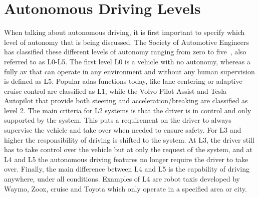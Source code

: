 
\section{Autonomous Driving Levels}
\label{sec:intro_ad}
When talking about autonomous driving, it is first important to specify which level of autonomy that is being discussed. The Society of Automotive Engineers has classified these different levels of autonomy ranging from zero to five~\cite{SAE2021}, also referred to as L0-L5. The first level L0 is a vehicle with no autonomy, whereas a fully \gls{av} that can operate in any environment and without any human supervision is defined as L5. Popular \gls{adas} functions today, like lane centering or adaptive cruise control are classified as L1, while the Volvo Pilot Assist and Tesla Autopilot that provide both steering and acceleration/breaking are classified as level 2. The main criteria for L2 systems is that the driver is in control and only supported by the system. This puts a requirement on the driver to always supervise the vehicle and take over when needed to ensure safety. For L3 and higher the responsibility of driving is shifted to the system. At L3, the driver still has to take control over the vehicle but at only the request of the system, and at L4 and L5 the autonomous driving features no longer require the driver to take over. Finally, the main difference between L4 and L5 is the capability of driving anywhere, under all conditions. Examples of L4 are robot taxis developed by Waymo, Zoox, cruise and Toyota which only operate in a specified area or city. 

